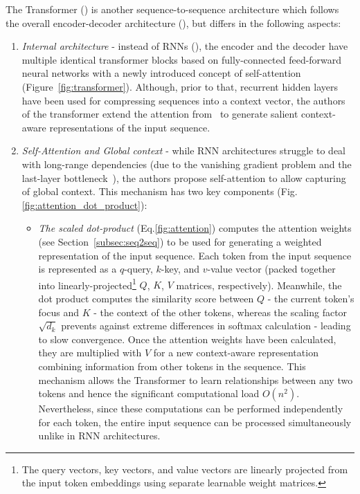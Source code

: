 The Transformer (\cite{vaswani2017attention}) is another sequence-to-sequence architecture which follows the overall encoder-decoder architecture (\cite{sutskever2014sequence}), but differs in the following aspects:
\begin{enumerate}
    \item \emph{Internal architecture} - instead of RNNs (\cite{cho-etal-2014-learning}), the encoder and the decoder have multiple identical transformer blocks based on fully-connected feed-forward neural networks with a newly introduced concept of self-attention (Figure~\ref{fig:transformer}).
    Although, prior to that, recurrent hidden layers have been used for compressing sequences into a context vector, the authors of the transformer extend the attention from~\cite{bahdanau2016neural} to generate salient context-aware representations of the input sequence.
    \item \emph{Self-Attention and Global context} - while RNN architectures struggle to deal with long-range dependencies (due to the vanishing gradient problem and the last-layer bottleneck~\cite{bahdanau2016neural}), the authors propose
    self-attention to allow capturing of global context.
    This mechanism has two key components (Fig.\ref{fig:attention_dot_product}):
    \begin{itemize}
        \item \emph{The scaled dot-product} (Eq.\ref{fig:attention}) computes the attention weights (see Section~\ref{subsec:seq2seq}) to be used for generating a weighted representation of the input sequence.
        Each token from the input sequence is represented as a $q$-query, $k$-key, and $v$-value vector (packed together into linearly-projected\footnote{
            The query vectors, key vectors, and value vectors are linearly projected from the input token embeddings using separate learnable weight matrices.
        } $Q$, $K$, $V$ matrices, respectively).
        Meanwhile, the dot product computes the similarity score between $Q$ - the current token's focus and $K$ - the context of the other tokens, whereas the scaling factor $\sqrt{d_{k}}$ prevents against extreme differences in softmax calculation - leading to slow convergence.
        Once the attention weights have been calculated, they are multiplied with $V$ for a new context-aware representation combining information from other tokens in the sequence.
        This mechanism allows the Transformer to learn relationships between any two tokens and hence the significant computational load $O(n^2)$.
        Nevertheless, since these computations can be performed independently for each token, the entire input sequence can be processed simultaneously unlike in RNN architectures.


\end{itemize}
\end{enumerate}

